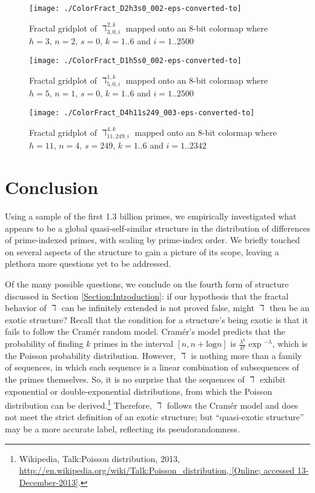 \documentclass[12pt,longtitle,times]{amsart}
\begin{document}
\begin{figure}
\centering
\texttt{[image: ./ColorFract\_D2h3s0\_002-eps-converted-to]}
\caption{Fractal gridplot of $\daleth_{3,0,i}^{2,k}$ mapped onto an 8-bit colormap where $h=3$, $n=2$, $s=0$, $k=1..6$ and $i=1..2500$}
\label{fig:ColorFract_D2h3s0}
\end{figure}

\begin{figure}
\centering
\texttt{[image: ./ColorFract\_D1h5s0\_002-eps-converted-to]}
\caption{Fractal gridplot of $\daleth_{5,0,i}^{1,k}$ mapped onto an 8-bit colormap where $h=5$, $n=1$, $s=0$, $k=1..6$ and $i=1..2500$}
\label{fig:ColorFract_D1h5s0}
\end{figure}

\begin{figure}
\centering
\texttt{[image: ./ColorFract\_D4h11s249\_003-eps-converted-to]}
\caption{Fractal gridplot of $\daleth_{11,249,i}^{4,k}$ mapped onto an 8-bit colormap where $h=11$, $n=4$, $s=249$, $k=1..6$ and $i=1..2342$}
\label{fig:ColorFract_D4h11s249}
\end{figure}

\enlargethispage{10\baselineskip}

\clearpage

\section{Conclusion}
Using a sample of the first 1.3 billion primes, we empirically investigated what appears to be a global quasi-self-similar structure in the distribution of differences of prime-indexed primes, with scaling by prime-index order. We briefly touched on several aspects of the structure to gain a picture of its scope, leaving a plethora more questions yet to be addressed. 

Of the many possible questions, we conclude on the fourth form of structure discussed in Section \ref{Section:Introduction}: if our hypothesis that the fractal behavior of $\daleth$ can be infinitely extended is not proved false, might $\daleth$ then be an exotic structure? Recall that the condition for a structure's being exotic is that it fails to follow the Cram\'{e}r random model. Cram\'er's model predicts that the probability of finding $k$ primes in the interval $[n,n+\text{log}n]$ is $\frac{\lambda{}^k}{k!}\exp{}^{-\lambda}$, which is the Poisson probability distribution\cite{Soundararajan-the-distribution}. However, $\daleth$ is nothing more than a family of sequences, in which each sequence is a linear combination of subsequences of the primes themselves. So, it is no surprise that the sequences of $\daleth$ exhibit exponential or double-exponential distributions, from which the Poisson distribution can be derived.\footnote{Wikipedia, Talk:Poisson distribution, 2013, \url{http://en.wikipedia.org/wiki/Talk:Poisson_distribution, [Online; accessed  13-December-2013]}.} Therefore, $\daleth$ follows the Cram\'{e}r model and does not meet the strict definition of an exotic structure; but ``quasi-exotic structure'' may be a more accurate label, reflecting its pseudorandomness.
\end{document}
